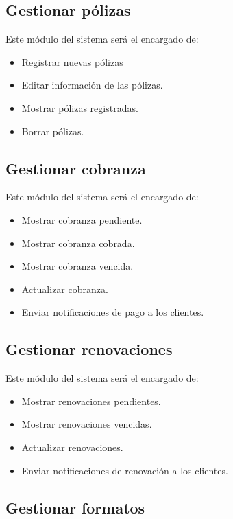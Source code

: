 \subsection*{Gestionar pólizas}

Este m\'odulo del sistema ser\'a el encargado de:
\begin{itemize}
	\item Registrar nuevas pólizas
	\item Editar información de las pólizas.
	\item Mostrar pólizas registradas.
	\item Borrar pólizas.
\end{itemize}

\subsection*{Gestionar cobranza}

Este m\'odulo del sistema ser\'a el encargado de:
\begin{itemize}
	\item Mostrar cobranza pendiente.
	\item Mostrar cobranza cobrada.
	\item Mostrar cobranza vencida.
	\item Actualizar cobranza.
	\item Enviar notificaciones de pago a los clientes.
\end{itemize}

\subsection*{Gestionar renovaciones}

Este m\'odulo del sistema ser\'a el encargado de:
\begin{itemize}
	\item Mostrar renovaciones pendientes.
	\item Mostrar renovaciones vencidas.
	\item Actualizar renovaciones.
	\item Enviar notificaciones de renovación a los clientes.
\end{itemize}

\subsection*{Gestionar formatos}


